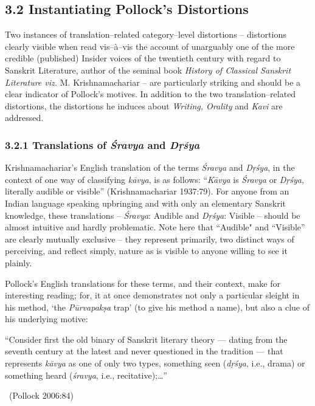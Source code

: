 \subsection*{3.2 Instantiating Pollock’s Distortions}

Two instances of translation–related category–level distortions – distortions clearly visible when read vis–à–vis the account of unarguably one of the more credible (published) Insider voices of the twentieth century with regard to Sanskrit Literature, author of the seminal book \textit{History of Classical Sanskrit Literature viz.} M. Krishnamachariar – are particularly striking and should be a clear indicator of Pollock’s motives. In addition to the two translation–related distortions, the distortions he induces about \textit{Writing, Orality} and \textit{Kavi} are addressed.

\subsubsection*{3.2.1 Translations of \textit{Śravya} and \textit{Dṛśya}}

Krishnamachariar’s English translation of the terms \textit{Śravya} and \textit{Dṛśya}, in the context of one way of classifying \textit{kāvya}, is as follows: “\textit{Kāvya} is \textit{Śravya} or \textit{Dṛśya}, literally audible or visible” (Krishnamachariar 1937:79). For anyone from an Indian language speaking upbringing and with only an elementary Sanskrit knowledge, these translations – \textit{Śravya}: Audible and \textit{Dṛśya}: Visible – should be almost intuitive and hardly problematic. Note here that “Audible" and “Visible” are clearly mutually exclusive – they represent primarily, two distinct ways of perceiving, and reflect simply, nature as is visible to anyone willing to see it plainly.

Pollock’s English translations for these terms, and their context, make for interesting reading; for, it at once demonstrates not only a particular sleight in his method, ‘the \textit{Pūrvapakṣa} trap’ (to give his method a name), but also a clue of his underlying motive:

\begin{myquote}
“Consider first the old binary of Sanskrit literary theory — dating from the seventh century at the latest and never questioned in the tradition — that represents \textit{kāvya} as one of only two types, something seen (\textit{dṛśya}, i.e., drama) or something heard (\textit{śravya}, i.e., recitative);…” 

~\hfill (Pollock 2006:84)
\end{myquote}

